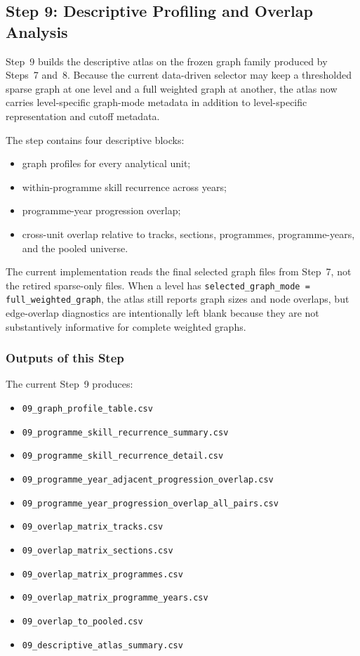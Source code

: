 \subsection{Step 9: Descriptive Profiling and Overlap Analysis}
\label{sec:step9}

Step~9 builds the descriptive atlas on the frozen graph family produced by Steps~7 and~8. Because the current data-driven selector may keep a thresholded sparse graph at one level and a full weighted graph at another, the atlas now carries level-specific graph-mode metadata in addition to level-specific representation and cutoff metadata.

The step contains four descriptive blocks:
\begin{itemize}
    \item graph profiles for every analytical unit;
    \item within-programme skill recurrence across years;
    \item programme-year progression overlap;
    \item cross-unit overlap relative to tracks, sections, programmes, programme-years, and the pooled universe.
\end{itemize}

The current implementation reads the final selected graph files from Step~7, not the retired sparse-only files. When a level has \texttt{selected\_graph\_mode = full\_weighted\_graph}, the atlas still reports graph sizes and node overlaps, but edge-overlap diagnostics are intentionally left blank because they are not substantively informative for complete weighted graphs.

\subsubsection{Outputs of this Step}
\label{sec:step9_outputs}

The current Step~9 produces:
\begin{itemize}
    \item \texttt{09\_graph\_profile\_table.csv}
    \item \texttt{09\_programme\_skill\_recurrence\_summary.csv}
    \item \texttt{09\_programme\_skill\_recurrence\_detail.csv}
    \item \texttt{09\_programme\_year\_adjacent\_progression\_overlap.csv}
    \item \texttt{09\_programme\_year\_progression\_overlap\_all\_pairs.csv}
    \item \texttt{09\_overlap\_matrix\_tracks.csv}
    \item \texttt{09\_overlap\_matrix\_sections.csv}
    \item \texttt{09\_overlap\_matrix\_programmes.csv}
    \item \texttt{09\_overlap\_matrix\_programme\_years.csv}
    \item \texttt{09\_overlap\_to\_pooled.csv}
    \item \texttt{09\_descriptive\_atlas\_summary.csv}
\end{itemize}

